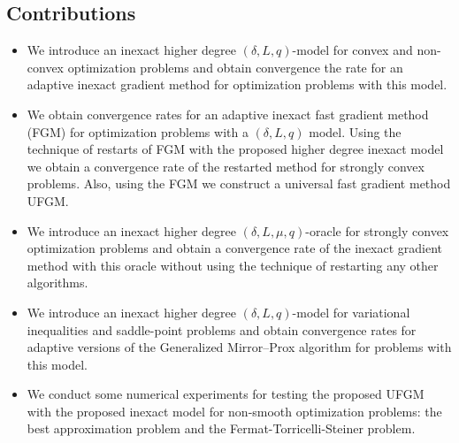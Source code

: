 \documentclass[11pt]{amsart}
\theoremstyle{definition}
\numberwithin{equation}{section}
\begin{document}
\subsection{ Contributions}
\begin{itemize}
    \item We introduce an inexact higher degree $(\delta, L, q)$-model for convex and non-convex optimization problems and obtain convergence the rate for an adaptive inexact gradient method for optimization problems with this model.

    \item We obtain convergence rates for an adaptive inexact fast gradient method (FGM) for optimization problems with a $(\delta, L, q)$ model. Using the technique of restarts of FGM with the proposed higher degree inexact model we obtain a convergence rate of the restarted method for strongly convex problems. Also, using the FGM we construct a universal fast gradient method UFGM.

    \item We introduce an inexact higher degree $(\delta, L, \mu, q)$-oracle for strongly convex optimization problems and obtain a convergence rate of the inexact gradient method with this oracle without using the technique of restarting any other algorithms.

    \item  We introduce an inexact higher degree $(\delta, L, q)$-model for variational inequalities and saddle-point problems and obtain convergence rates for adaptive versions of the Generalized Mirror–Prox algorithm for problems with this model.

    \item We conduct some numerical experiments for testing the proposed UFGM with the proposed inexact model for non-smooth optimization problems: the best approximation problem and the Fermat-Torricelli-Steiner problem.     
\end{itemize}
\end{document}
